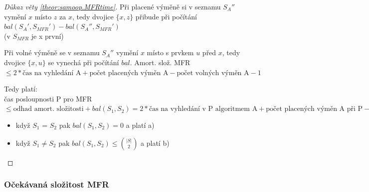 \begin{proof}[Důkaz věty \ref{theor:samoop.MFRtime}]
Při placené výměně si v seznamu $S_A''$ vymění $x$ místo $z$ za $x$, tedy
dvojice $\{x,z\}$ přibude při počítání 
$bal(S_A', S_{MFR}') - bal(S_A'', S_{MFR}')$ \\
(v $S_{MFR}$ je x první)
\par
Při volné výměně se v seznamu $S_A''$ vymění $x$ místo s prvkem $u$ před
$x$, tedy dvojice $\{x,u\}$ se vynechá při počítání $bal$.
Amort. slož. MFR $\leq 2*\text{čas na vyhledání A} +
\text{počet placených výměn A} - \text{počet volných výměn A} - 1$
\par

Tedy platí: \\
čas posloupnosti P pro MFR 
$\leq \text{odhad amort. složitosti} + bal(S_1, S_2) = 
2*\text{čas na vyhledání v P algoritmem A} + 
\text{počet placených výměn A při P} - 
\text{počet volných výměn A při P} - |P| + bal(S_1, S_2)$


\begin{itemize}
\item když $S_1$ = $S_2$ pak $bal(S_1, S_2)=0$ a platí a)
\item když $S_1 \neq S_2$ pak $bal(S_1, S_2) \leq \binom{|S|}{2}$ a
platí b)
\end{itemize}
\end{proof}


\subsubsection{Očekávaná složitost MFR}


